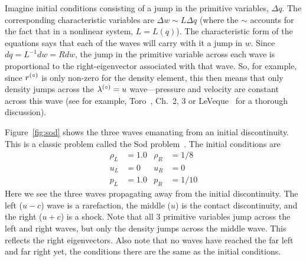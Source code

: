 Imagine initial conditions consisting of a jump in the primitive
variables, $\Delta q$.  The corresponding characteristic variables are
$\Delta w \sim L \Delta q$ (where the $\sim$ accounts for the fact
that in a nonlinear system, $L = L(q)$).  The characteristic form
of the equations says that each of the waves will carry with it
a jump in $w$.  Since $dq = L^{-1}dw = R dw$, the jump
in the primitive variable across each wave is proportional to the
right-eigenvector associated with that wave.  So, for example, since
$r^{(\circ)}$ is only non-zero for the density element, this then means
that only density jumps across the $\lambda^{(\circ)} = u$ wave---pressure
and velocity are constant across this wave (see for example,
Toro~\cite{toro:1997}, Ch.\ 2, 3 or LeVeque~\cite{leveque:2002} for a
thorough discussion).

Figure~\ref{fig:sod} shows the three waves emanating from an initial
discontinuity.  This is a classic problem called the Sod
problem~\cite{sod:1978}.  The initial conditions are
\begin{align}
\rho_L &= 1.0    &  \rho_R &= 1/8 \nonumber \\
u_L   &= 0       &  u_R    &= 0   \\
p_L    &= 1.0    &  p_R    &= 1/10 \nonumber
\end{align}
Here we see the three waves propagating away from the initial
discontinuity.  The left ($u-c$) wave is a rarefaction, the middle
($u$) is the contact discontinuity, and the right ($u+c$) is a
shock. Note that all 3 primitive variables jump across the left and
right waves, but only the density jumps across the middle wave.  This
reflects the right eigenvectors.  Also note that no waves have reached
the far left and far right yet, the conditions there are the same as
the initial conditions.  


